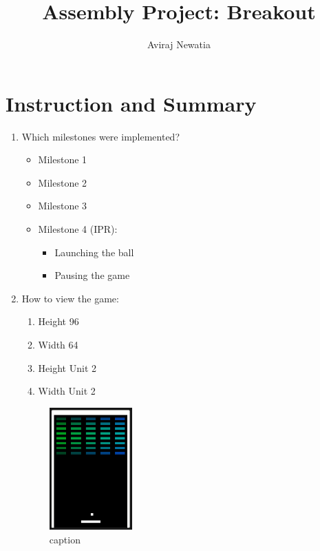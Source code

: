 \documentclass{article}
\title{Assembly Project: Breakout}
\author{Aviraj Newatia}
\begin{document}
\maketitle

\section{Instruction and Summary}

\begin{enumerate}

    \item Which milestones were implemented? 
    \begin{itemize}
    \item   Milestone 1
    \item   Milestone 2
    \item   Milestone 3
    \item   Milestone 4 (IPR):
    \begin{itemize}
        \item Launching the ball
        \item Pausing the game
    \end{itemize}
    \end{itemize}

    \item How to view the game:
    
    \begin{enumerate}

    \item Height 96
    \item Width 64
    \item Height Unit 2
    \item Width Unit 2


    \end{enumerate}

    

\begin{figure}[ht!]
    \centering
    \includegraphics[width=0.3\textwidth]{scene.png}
    \caption{caption}
    \label{Instructions}
\end{figure}


\end{enumerate}
\end{document}

